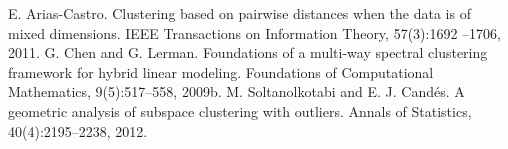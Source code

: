 \documentclass[11pt,reqno]{article}
\numberwithin{equation}{section}
\theoremstyle{plain}
\begin{document}
\begin{thebibliography}{}
E. Arias-Castro. Clustering based on pairwise distances when the data is of mixed dimensions.
IEEE Transactions on Information Theory, 57(3):1692 –1706, 2011.
G. Chen and G. Lerman. Foundations of a multi-way spectral clustering framework for
hybrid linear modeling. Foundations of Computational Mathematics, 9(5):517–558, 2009b.
M. Soltanolkotabi and E. J. Cand\'es. A geometric analysis of subspace clustering with
outliers. Annals of Statistics, 40(4):2195–2238, 2012.
\end{thebibliography}
\end{document}
